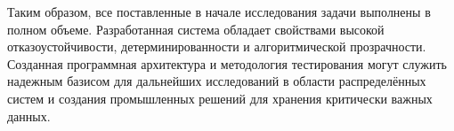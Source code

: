 Таким образом, все поставленные в начале исследования задачи выполнены в полном объеме. Разработанная система обладает свойствами высокой отказоустойчивости, детерминированности и алгоритмической прозрачности. Созданная программная архитектура и методология тестирования могут служить надежным базисом для дальнейших исследований в области распределённых систем и создания промышленных решений для хранения критически важных данных.
